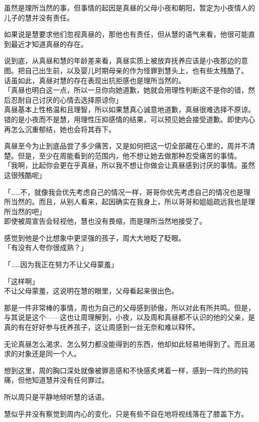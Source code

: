 虽然是理所当然的事，但事情的起因是真昼的父母小夜和朝阳，暂定为小夜情人的儿子的慧并没有责任。

如果说是慧要求他们忽视真昼的，那他也有责任，但从慧的语气来看，他很可能直到最近才知道真昼的存在。

说到底，从真昼和慧的年龄差来看，真昼实质上被放弃抚养应该是小夜那边的意图。把自己出生前，以及婴儿时期母亲的作为怪罪到慧头上，也有些太残酷了。\\

话虽如此，真昼对慧的存在表现出抗拒感也是理所当然的。\\

「真昼也明白这一点，所以一旦你向她道歉，她就会用理性判断这不是你的错，然后忍耐自己讨厌的心情去选择原谅你」\\

真昼基本上性格温和且理智，所以如果慧真心诚意地道歉，真昼很难选择不原谅。错的是小夜而不是慧，用理性压抑感情的结果，可以预见她会接受道歉。即使内心再怎么沉重郁结，她也会将其吞下。

真昼至今为止到底品尝了多少痛苦，又是如何把这一切全部藏在心里的，周并不清楚。但是，至少在周能看到的范围内，他不想让她去做那种忍受痛苦的事情。\\

「我啊，比起你会更在乎真昼，所以我不想让你做会让真昼感到讨厌的事情。虽然这很残酷呢」

「……不，就像我会优先考虑自己的情况一样，哥哥你优先考虑自己的情况也是理所当然的。而且，从别人看来，起因确实在我身上，所以哥哥和姐姐疏远我也是理所当然的吧」\\

即使被周宣告会轻视他，慧也没有畏缩，而是理所当然地接受了。

感觉到他是个比想象中更坚强的孩子，周大大地眨了眨眼。\\

「有没有人夸你很成熟？」

「……因为我正在努力不让父母蒙羞」

「这样啊」\\

不让父母蒙羞，这说明在慧的眼里，父母看起来很出色。

那是一件非常棒的事情，周也为自己的父母感到骄傲，所以对此有所共鸣。但是，与其说是这个——这也让周理解到，小夜，以及周和真昼都不认识的他的父亲，是真的有在好好参与抚养孩子，这让周感到一丝无奈和难以释怀。

无论真昼怎么渴求、怎么努力都没能得到的东西，他却如此轻易地得到了。而且渴求的对象还是同一个人。

想到这里，周的胸口深处就像被罪恶感和不快感炙烤着一样，感到一阵灼热的钝痛，但他知道慧并没有任何罪过。

所以周只是平静地倾听慧的话语。

慧似乎并没有察觉到周内心的变化，只是有些不自在地将视线落在了膝盖下方。
